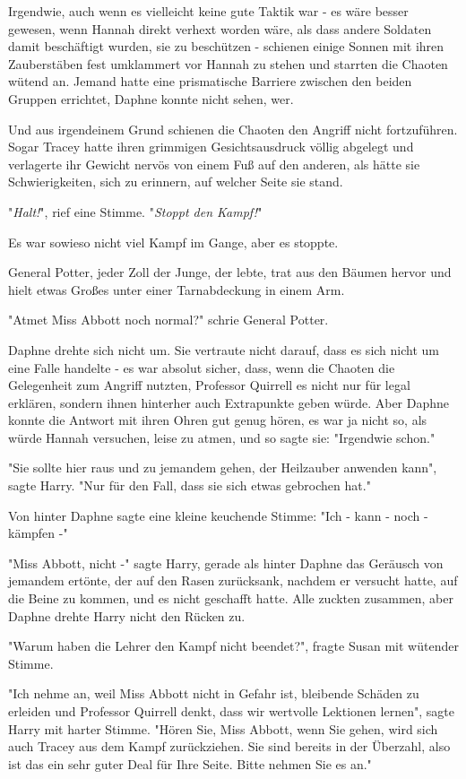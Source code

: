 {Irgendwie, auch wenn es vielleicht keine gute Taktik war - es wäre besser gewesen, wenn Hannah direkt verhext worden wäre, als dass andere Soldaten damit beschäftigt wurden, sie zu beschützen - schienen einige Sonnen mit ihren Zauberstäben fest umklammert vor Hannah zu stehen und starrten die Chaoten wütend an. Jemand hatte eine prismatische Barriere zwischen den beiden Gruppen errichtet, Daphne konnte nicht sehen, wer.

Und aus irgendeinem Grund schienen die Chaoten den Angriff nicht fortzuführen. Sogar Tracey hatte ihren grimmigen Gesichtsausdruck völlig abgelegt und verlagerte ihr Gewicht nervös von einem Fuß auf den anderen, als hätte sie Schwierigkeiten, sich zu erinnern, auf welcher Seite sie stand.

"\emph{Halt!}", rief eine Stimme. "\emph{Stoppt den Kampf!}"

Es war sowieso nicht viel Kampf im Gange, aber es stoppte.

General Potter, jeder Zoll der Junge, der lebte, trat aus den Bäumen hervor und hielt etwas Großes unter einer Tarnabdeckung in einem Arm.

"Atmet Miss Abbott noch normal?" schrie General Potter.

Daphne drehte sich nicht um. Sie vertraute nicht darauf, dass es sich nicht um eine Falle handelte - es war absolut sicher, dass, wenn die Chaoten die Gelegenheit zum Angriff nutzten, Professor Quirrell es nicht nur für legal erklären, sondern ihnen hinterher auch Extrapunkte geben würde. Aber Daphne konnte die Antwort mit ihren Ohren gut genug hören, es war ja nicht so, als würde Hannah versuchen, leise zu atmen, und so sagte sie: "Irgendwie schon."

"Sie sollte hier raus und zu jemandem gehen, der Heilzauber anwenden kann", sagte Harry. "Nur für den Fall, dass sie sich etwas gebrochen hat."

Von hinter Daphne sagte eine kleine keuchende Stimme: "Ich - kann - noch - kämpfen -"

"Miss Abbott, nicht -" sagte Harry, gerade als hinter Daphne das Geräusch von jemandem ertönte, der auf den Rasen zurücksank, nachdem er versucht hatte, auf die Beine zu kommen, und es nicht geschafft hatte. Alle zuckten zusammen, aber Daphne drehte Harry nicht den Rücken zu.

"Warum haben die Lehrer den Kampf nicht beendet?", fragte Susan mit wütender Stimme.

"Ich nehme an, weil Miss Abbott nicht in Gefahr ist, bleibende Schäden zu erleiden und Professor Quirrell denkt, dass wir wertvolle Lektionen lernen", sagte Harry mit harter Stimme. "Hören Sie, Miss Abbott, wenn Sie gehen, wird sich auch Tracey aus dem Kampf zurückziehen. Sie sind bereits in der Überzahl, also ist das ein sehr guter Deal für Ihre Seite. Bitte nehmen Sie es an."

}
